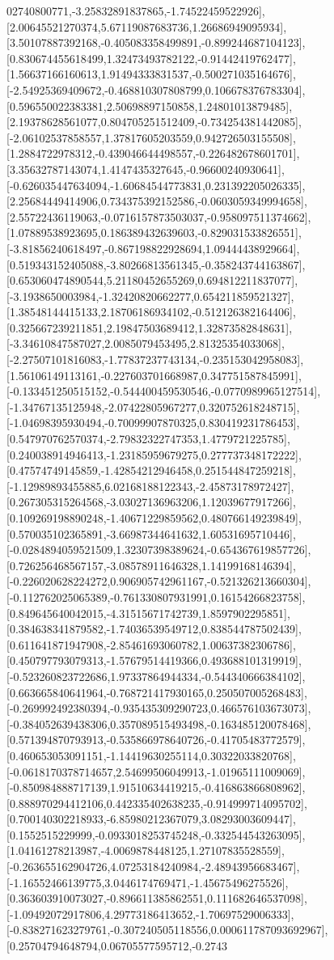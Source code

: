 \documentclass{article}
\begin{document}
02740800771,-3.25832891837865,-1.74522459522926],[2.00645521270374,5.67119087683736,1.26686949095934],[3.50107887392168,-0.405083358499891,-0.899244687104123],[0.830674455618499,1.32473493782122,-0.91442419762477],[1.56637166160613,1.91494333831537,-0.500271035164676],[-2.54925369409672,-0.468810307808799,0.106678376783304],[0.596550022383381,2.50698897150858,1.24801013879485],[2.19378628561077,0.804705251512409,-0.734254381442085],[-2.06102537858557,1.37817605203559,0.942726503155508],[1.2884722978312,-0.439046644498557,-0.226482678601701],[3.35632787143074,1.4147435327645,-0.96600240930641],[-0.626035447634094,-1.60684544773831,0.231392205026335],[2.25684449414906,0.734375392152586,-0.0603059349994658],[2.55722436119063,-0.0716157873503037,-0.958097511374662],[1.07889538923695,0.186389432639603,-0.829031533826551],[-3.81856240618497,-0.867198822928694,1.09444438929664],[0.519343152405088,-3.80266813561345,-0.358243744163867],[0.653060474890544,5.21180452655269,0.694812211837077],[-3.1938650003984,-1.32420820662277,0.654211859521327],[1.38548144415133,2.18706186934102,-0.512126382164406],[0.325667239211851,2.19847503689412,1.32873582848631],[-3.34610847587027,2.0085079453495,2.81325354033068],[-2.27507101816083,-1.77837237743134,-0.235153042958083],[1.56106149113161,-0.227603701668987,0.347751587845991],[-0.133451250515152,-0.544400459530546,-0.0770989965127514],[-1.34767135125948,-2.07422805967277,0.320752618248715],[-1.04698395930494,-0.70099907870325,0.830419231786453],[0.547970762570374,-2.79832322747353,1.4779721225785],[0.240038914946413,-1.23185959679275,0.277737348172222],[0.47574749145859,-1.42854212946458,0.251544847259218],[-1.12989893455885,6.02168188122343,-2.45873178972427],[0.267305315264568,-3.03027136963206,1.12039677917266],[0.109269198890248,-1.40671229859562,0.480766149239849],[0.570035102365891,-3.66987344641632,1.60531695710446],[-0.0284894059521509,1.32307398389624,-0.654367619857726],[0.726256468567157,-3.08578911646328,1.14199168146394],[-0.226020628224272,0.906905742961167,-0.521326213660304],[-0.112762025065389,-0.761330807931991,0.16154266823758],[0.849645640042015,-4.31515671742739,1.8597902295851],[0.384638341879582,-1.74036539549712,0.838544787502439],[0.611641871947908,-2.85461693060782,1.00637382306786],[0.450797793079313,-1.57679514419366,0.493688101319919],[-0.523260823722686,1.97337864944334,-0.544340666384102],[0.663665840641964,-0.768721417930165,0.250507005268483],[-0.269992492380394,-0.935435309290723,0.466576103673073],[-0.384052639438306,0.357089515493498,-0.163485120078468],[0.571394870793913,-0.535866978640726,-0.41705483772579],[0.460653053091151,-1.14419630255114,0.30322033820768],[-0.0618170378714657,2.54699506049913,-1.01965111009069],[-0.850984888717139,1.91510634419215,-0.416863866808962],[0.888970294412106,0.442335402638235,-0.914999714095702],[0.700140302218933,-6.85980212367079,3.08293003609447],[0.1552515229999,-0.0933018253745248,-0.332544543263095],[1.04161278213987,-4.0069878448125,1.27107835528559],[-0.263655162904726,4.07253184240984,-2.48943956683467],[-1.16552466139775,3.0446174769471,-1.45675496275526],[0.363603910073027,-0.896611385862551,0.111682646537098],[-1.09492072917806,4.29773186413652,-1.70697529006333],[-0.838271623279761,-0.307240505118556,0.000611787093692967],[0.25704794648794,0.06705577595712,-0.2743
\end{document}
